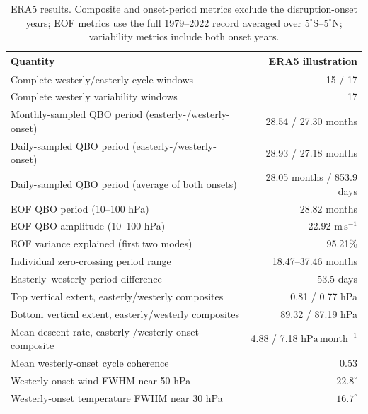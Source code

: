 \documentclass[11pt,a4paper]{article}
\begin{document}
\begin{table}[htbp]
\centering
\caption{ERA5 results. Composite and onset-period metrics exclude the
disruption-onset years; EOF metrics use the full 1979--2022 record averaged
over $5^{\circ}$S--$5^{\circ}$N; variability metrics
include both onset years.}
\label{tab:example-results}
\begin{tabularx}{0.94\textwidth}{@{}Xr@{}}
\toprule
Quantity & ERA5 illustration \\
\midrule
Complete westerly/easterly cycle windows & 15 / 17 \\
Complete westerly variability windows & 17 \\
Monthly-sampled QBO period (easterly-/westerly-onset) & 28.54 / 27.30 months \\
Daily-sampled QBO period (easterly-/westerly-onset) & 28.93 / 27.18 months \\
Daily-sampled QBO period (average of both onsets) & 28.05 months / 853.9 days \\
EOF QBO period (10--100 hPa) & 28.82 months \\
EOF QBO amplitude (10--100 hPa) & 22.92 $\mathrm{m\,s^{-1}}$ \\
EOF variance explained (first two modes) & 95.21\% \\
Individual zero-crossing period range & 18.47--37.46 months \\
Easterly--westerly period difference & 53.5 days \\
Top vertical extent, easterly/westerly composites & 0.81 / 0.77 hPa \\
Bottom vertical extent, easterly/westerly composites & 89.32 / 87.19 hPa \\
Mean descent rate, easterly-/westerly-onset composite & 4.88 / 7.18 $\mathrm{hPa\,month^{-1}}$ \\
Mean westerly-onset cycle coherence & 0.53 \\
Westerly-onset wind FWHM near 50 hPa & $22.8^{\circ}$ \\
Westerly-onset temperature FWHM near 30 hPa & $16.7^{\circ}$ \\
\bottomrule
\end{tabularx}
\end{table}
\end{document}
